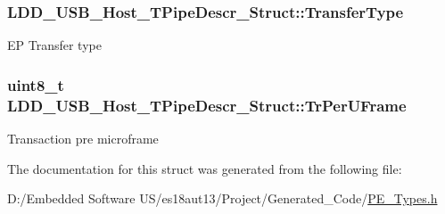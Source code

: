 \subsubsection[{Transfer\+Type}]{ L\+D\+D\+\_\+\+U\+S\+B\+\_\+\+Host\+\_\+\+T\+Pipe\+Descr\+\_\+\+Struct\+::\+Transfer\+Type}\label{struct_l_d_d___u_s_b___host___t_pipe_descr___struct_a42bf0ec64bda6f7f31d32e3f4cd5df13}
E\+P Transfer type \hypertarget{struct_l_d_d___u_s_b___host___t_pipe_descr___struct_adb11454d0380a421cf7ab4fc225e5c41}{}
\subsubsection[{Tr\+Per\+U\+Frame}]{\setlength{\rightskip}{0pt plus 5cm}uint8\+\_\+t L\+D\+D\+\_\+\+U\+S\+B\+\_\+\+Host\+\_\+\+T\+Pipe\+Descr\+\_\+\+Struct\+::\+Tr\+Per\+U\+Frame}\label{struct_l_d_d___u_s_b___host___t_pipe_descr___struct_adb11454d0380a421cf7ab4fc225e5c41}
Transaction pre microframe 

The documentation for this struct was generated from the following file\+:\begin{DoxyCompactItemize}
\item 
D\+:/\+Embedded Software U\+S/es18aut13/\+Project/\+Generated\+\_\+\+Code/\hyperlink{_p_e___types_8h}{P\+E\+\_\+\+Types.\+h}\end{DoxyCompactItemize}
